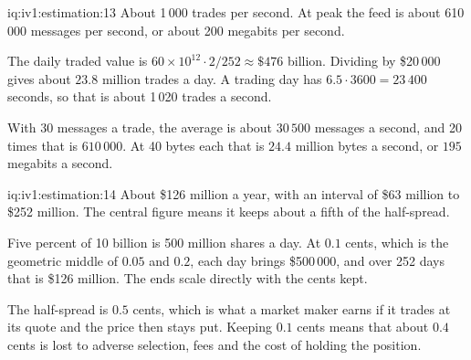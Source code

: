 \begin{solution}{iq:iv1:estimation:13}
About 1\,000 trades per second. At peak the feed is about 610\,000 messages per second, or about 200 megabits per second.

The daily traded value is $60 \times 10^{12} \cdot 2/252 \approx \$476$ billion. Dividing by \$20\,000 gives about $23.8$ million trades a day. A trading day has $6.5 \cdot 3600 = 23\,400$ seconds, so that is about 1\,020 trades a second.

With 30 messages a trade, the average is about $30\,500$ messages a second, and 20 times that is $610\,000$. At 40 bytes each that is $24.4$ million bytes a second, or $195$ megabits a second.

\end{solution}

\begin{solution}{iq:iv1:estimation:14}
About \$126 million a year, with an interval of \$63 million to \$252 million. The central figure means it keeps about a fifth of the half-spread.

Five percent of 10 billion is 500 million shares a day. At $0.1$ cents, which is the geometric middle of $0.05$ and $0.2$, each day brings \$500\,000, and over 252 days that is \$126 million. The ends scale directly with the cents kept.

The half-spread is $0.5$ cents, which is what a market maker earns if it trades at its quote and the price then stays put. Keeping $0.1$ cents means that about $0.4$ cents is lost to adverse selection, fees and the cost of holding the position.

\end{solution}

